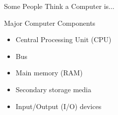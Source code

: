 \documentclass[graphics]{beamer}
\begin{document}
\begin{frame}{Some People Think a Computer is...}
    \centering
\end{frame}

\begin{frame}{Major Computer Components}
    \begin{itemize}
        \item Central Processing Unit (CPU)
        \item Bus
        \item Main memory (RAM)
        \item Secondary storage media
        \item Input/Output (I/O) devices
    \end{itemize}
\end{frame}
\end{document}
